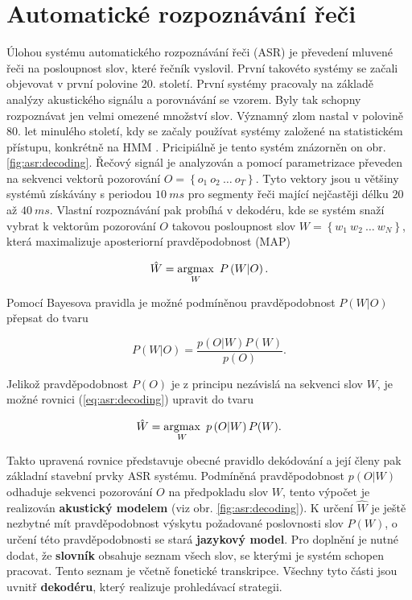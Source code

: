 \chapter{Automatické rozpoznávání řeči}
\label{chap:asr}

Úlohou systému automatického rozpoznávání řeči (ASR) je převedení mluvené řeči na posloupnost slov, které řečník vyslovil. První takovéto systémy se začali objevovat v první polovine 20. století. První systémy pracovaly na základě analýzy akustického signálu a porovnávání se vzorem. Byly tak schopny rozpoznávat jen velmi omezené množství slov. Významný zlom nastal v polovině 80. let minulého století, kdy se začaly používat systémy založené na statistickém přístupu, konkrétně na HMM \cite{Holmes2001}. Pricipiálně je tento systém znázorněn on obr. \ref{fig:asr:decoding}. Řečový signál je analyzován a pomocí parametrizace převeden na sekvenci vektorů pozorování $O = \left\{o_1\ o_2\ \dots\ o_T\right\}$. Tyto vektory jsou u většiny systémů získávány s periodou $10\ ms$ pro segmenty řeči mající nejčastěji délku $20$ až $40\ ms$. Vlastní rozpoznávání pak probíhá v dekodéru, kde se systém snaží vybrat k vektorům pozorování $O$ takovou posloupnost slov $W = \left\{w_1\ w_2\ \dots\ w_N\right\}$, která maximalizuje aposteriorní pravděpodobnost (MAP)

\begin{equation}
  \hat{W} = \operatorname*{argmax}_W\ P\left(W | O\right).
  \label{eq:asr:decoding}
\end{equation}

Pomocí Bayesova pravidla je možné podmíněnou pravděpodobnost $P\left(W | O\right)$ přepsat do tvaru

\begin{equation}
  P\left(W | O\right) = \frac{p(O|W)P(W)}{p(O)}.
\end{equation}

Jelikož pravděpodobnost $P(O)$ je z principu nezávislá na sekvenci slov $W$, je možné rovnici (\ref{eq:asr:decoding}) upravit do tvaru

\begin{equation}
  \hat{W} = \operatorname*{argmax}_W\ p\left(O | W\right)P(W).
  \label{eq:asr:decoding:generic}
\end{equation}

Takto upravená rovnice představuje obecné pravidlo dekódování a její členy pak základní stavební prvky ASR systému. Podmíněná pravděpodobnost $p(O | W)$ odhaduje sekvenci pozorování $O$ na předpokladu slov $W$, tento výpočet je realizován \textbf{akustický modelem} (viz obr. \ref{fig:asr:decoding}). K určení $\hat{W}$ je ještě nezbytné mít pravděpodobnost výskytu požadované poslovnosti slov $P\left(W\right)$, o určení této pravděpodobnosti se stará \textbf{jazykový model}. Pro doplnění je nutné dodat, že \textbf{slovník} obsahuje seznam všech slov, se kterými je systém schopen pracovat. Tento seznam je včetně fonetické transkripce. Všechny tyto části jsou uvnitř \textbf{dekodéru}, který realizuje prohledávací strategii.

